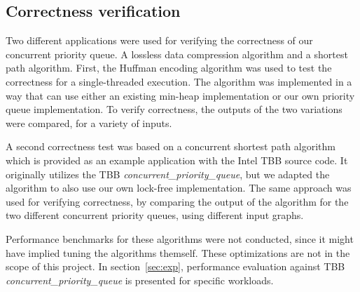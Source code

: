 \subsection{Correctness verification}
\label{subsec:corr_ver}
Two different applications were used for verifying the correctness of our concurrent priority queue.
A lossless data compression algorithm and a shortest path algorithm. 
First, the Huffman encoding algorithm was used to test the correctness for a single-threaded execution. The algorithm was implemented in a way that can use either an existing min-heap implementation or our own priority queue implementation.
To verify correctness, the outputs of the two variations were compared, for a variety of inputs.

A second correctness test was based on a concurrent shortest path algorithm which is provided as an example application with the Intel TBB source code.
It originally utilizes the TBB \textit{concurrent\_priority\_queue}, but we adapted the algorithm to also use our own lock-free implementation.
The same approach was used for verifying correctness, by comparing the output of the algorithm for the two different concurrent priority queues, using different input graphs.

Performance benchmarks for these algorithms were not conducted, since it might have implied tuning the algorithms themself.
These optimizations are not in the scope of this project.
In section~\ref{sec:exp}, performance evaluation against TBB \textit{concurrent\_priority\_queue} is presented for specific workloads.

